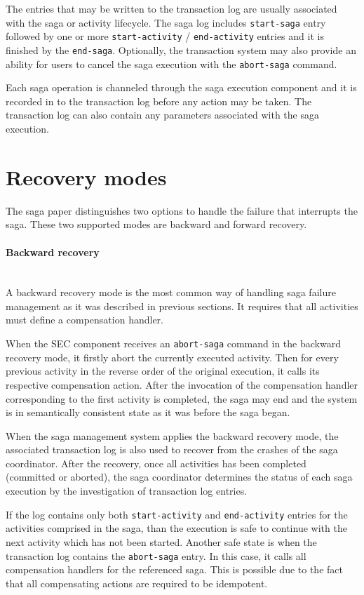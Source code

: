 \documentclass[oneside,
  digital, %
  table,   %
  nolof,     %
  nolot,     %
]{fithesis3}
\newcommand{\newlinepar}[1]{\paragraph{#1}\needspace{4\baselineskip}\mbox{}\\}
\begin{document}
The entries that may be written to the transaction log are usually associated with the saga or activity lifecycle. The saga log includes \texttt{start-saga} entry followed by one or more \texttt{start-activity} / \texttt{end-activity} entries and it is finished by the \texttt{end-saga}. Optionally, the transaction system may also provide an ability for users to cancel the saga execution with the \texttt{abort-saga} command. 

Each saga operation is channeled through the saga execution component and it is recorded in to the transaction log before any action may be taken. The transaction log can also contain any parameters associated with the saga execution.

\section{Recovery modes}
\label{sec:recovery-modes}

The saga paper \cite{sagas_publ} distinguishes two options to handle the failure that interrupts the saga. These two supported modes are backward and forward recovery.

\newlinepar{Backward recovery}

A backward recovery mode is the most common way of handling saga failure management as it was described in previous sections. It requires that all activities must define a compensation handler.

When the SEC component receives an \texttt{abort-saga} command in the backward recovery mode, it firstly abort the currently executed activity. Then for every previous activity in the reverse order of the original execution, it calls its respective compensation action. After the invocation of the compensation handler corresponding to the first activity is completed, the saga may end and the system is in semantically consistent state as it was before the saga began.

When the saga management system applies the backward recovery mode, the associated transaction log is also used to recover from the crashes of the saga coordinator. After the recovery, once all activities has been completed (committed or aborted), the saga coordinator determines the status of each saga execution by the investigation of transaction log entries. 

If the log contains only both \texttt{start-activity} and \texttt{end-activity} entries for the activities comprised in the saga,  than the execution is safe to continue with the next activity which has not been started. Another safe state is when the transaction log contains the \texttt{abort-saga} entry. In this case, it calls all compensation handlers for the referenced saga. This is possible due to the fact that all compensating actions are required to be idempotent.
\end{document}

